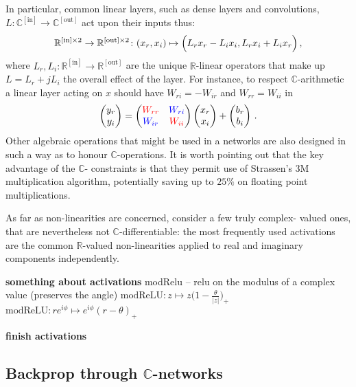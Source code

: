 \documentclass[a4paper,10pt]{article}
\newcommand{\important}[1]{\textbf{\color{red} #1}}
\newcommand{\todo}{\important}  %
\newcommand{\real}{\mathbb{R}}
\newcommand{\cplx}{\mathbb{C}}
\begin{document}
In particular, common linear layers, such as dense layers and convolutions,
$
  L \colon \cplx^{\mathrm{[in]}}
    \to \cplx^{\mathrm{[out]}}
$ act upon their inputs thus:
$$
\real^{\mathrm{[in]} \times 2}
  \to \real^{\mathrm{[out]} \times 2}
  \colon (x_r, x_i)
    \mapsto \Bigl(
      L_r x_r - L_i x_i,
      L_r x_i + L_i x_r
    \Bigr)
  \,, $$
where $
  L_r, L_i
    \colon \real^{\mathrm{[in]}}
      \to \real^{\mathrm{[out]}}
$ are the unique $\real$-linear operators that make up $L = L_r + j L_i$ the overall
effect of the layer. For instance, to respect $\cplx$-arithmetic a linear layer acting
on $x$ should have $W_{ri} = - W_{ir}$ and $W_{rr} = W_{ii}$ in
$$
  \begin{pmatrix}
    y_r \\ y_i
  \end{pmatrix}
    = \begin{pmatrix}
      {\color{red} W_{rr}} & {\color{blue} W_{ri}} \\ 
      {\color{blue} W_{ir}} & {\color{red} W_{ii}}
    \end{pmatrix}
    \begin{pmatrix}
      x_r \\ x_i
    \end{pmatrix}
    + \begin{pmatrix}
      b_r \\ b_i
    \end{pmatrix}
  \,. $$
Other algebraic operations that might be used in a networks are also designed in such a way as
to honour $\cplx$-operations. It is worth pointing out that the key advantage of the $\cplx$-%
constraints is that they permit use of Strassen's $3$M multiplication algorithm, potentially
saving up to $25\%$ on floating point multiplications.

As far as non-linearities are concerned, \cite{trabelsi_deep_2017} consider a few truly complex-%
valued ones, that are nevertheless not $\cplx$-differentiable: the most frequently used activations are the common $\real$-valued non-linearities applied to real and
imaginary components independently.

\todo{something about activations}
modRelu -- relu on the modulus of a complex value (preserves the angle)
$
\mathrm{modReLU}
  \colon z \mapsto z \bigl(
    1 - \tfrac\theta{\lvert z \rvert}
  \bigr)_+
$
$
\mathrm{modReLU}
  \colon r e^{i \phi} \mapsto e^{i \phi} (r - \theta)_+
$

\todo{finish activations}

\subsection{Backprop through $\cplx$-networks} %
\label{sub:backprop_through_c_networks}
\end{document}
